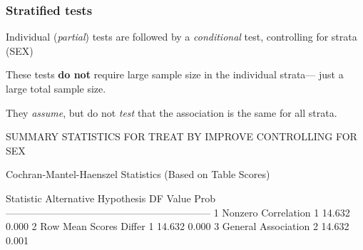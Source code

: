 \begin{frame}[fragile]
\frametitle{Stratified tests}
  \begin{itemize*}
    \item Individual (\emph{partial}) tests are followed by a \emph{conditional} test,
	controlling for strata (SEX)
	\item These tests {\bf do not} require large sample size in the individual
strata--- just a large total sample size.
    \item They \emph{assume}, but do not \emph{test} that the association is the
	same for all strata.
  \end{itemize*}

\begin{Output}[gobble=6]
                 SUMMARY STATISTICS FOR TREAT BY IMPROVE
                           CONTROLLING FOR SEX

        Cochran-Mantel-Haenszel Statistics (Based on Table Scores)

      Statistic   Alternative Hypothesis    DF       Value      Prob
      --------------------------------------------------------------
         1        Nonzero Correlation        1      14.632     0.000
         2        Row Mean Scores Differ     1      14.632     0.000
         3        General Association        2      14.632     0.001
\end{Output}

\end{frame}

